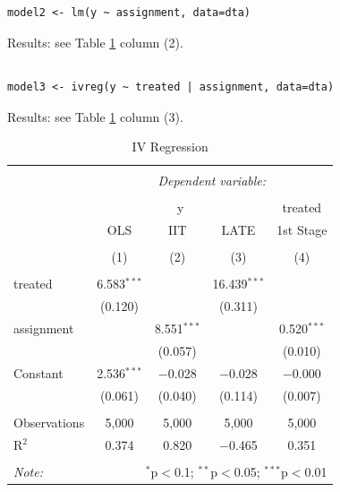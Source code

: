 \documentclass[a4paper]{article}
\begin{document}
\subsection{} %
\begin{verbatim}
model2 <- lm(y ~ assignment, data=dta)
\end{verbatim}
Results: see Table \ref{tab:ivreg} column (2).

\subsection{} %
\begin{verbatim}
model3 <- ivreg(y ~ treated | assignment, data=dta)
\end{verbatim}
Results: see Table \ref{tab:ivreg} column (3).



\begin{table}[!htbp] \centering 
  \caption{IV Regression} 
  \label{tab:ivreg} 
\begin{tabular}{@{\extracolsep{5pt}}lcccc} 
\\[-1.8ex]\hline 
\hline \\[-1.8ex] 
 & \multicolumn{4}{c}{\textit{Dependent variable:}} \\ 
\cline{2-5} 
\\[-1.8ex] & \multicolumn{3}{c}{y} & treated \\ 
 & OLS & IIT & LATE & 1st Stage \\ 
\\[-1.8ex] & (1) & (2) & (3) & (4)\\ 
\hline \\[-1.8ex] 
 treated & 6.583$^{***}$ &  & 16.439$^{***}$ &  \\ 
  & (0.120) &  & (0.311) &  \\ 
  assignment &  & 8.551$^{***}$ &  & 0.520$^{***}$ \\ 
  &  & (0.057) &  & (0.010) \\ 
  Constant & 2.536$^{***}$ & $-$0.028 & $-$0.028 & $-$0.000 \\ 
  & (0.061) & (0.040) & (0.114) & (0.007) \\ 
 \hline \\[-1.8ex] 
Observations & 5,000 & 5,000 & 5,000 & 5,000 \\ 
R$^{2}$ & 0.374 & 0.820 & $-$0.465 & 0.351 \\ 
\hline 
\hline \\[-1.8ex] 
\textit{Note:}  & \multicolumn{4}{r}{$^{*}$p$<$0.1; $^{**}$p$<$0.05; $^{***}$p$<$0.01} \\ 
\end{tabular} 
\end{table} 
\end{document}
